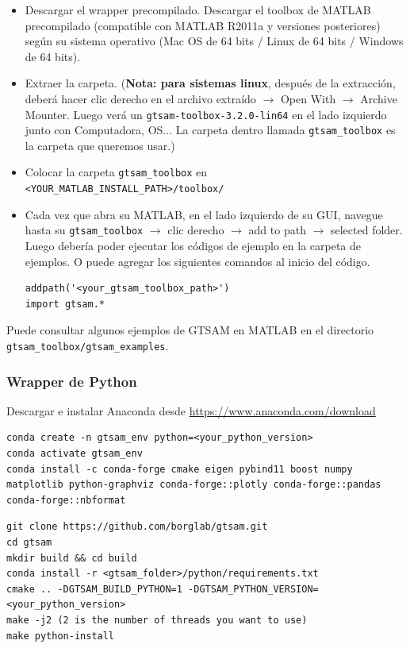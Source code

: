 \documentclass[tp]{lcc}
\begin{document}
\begin{itemize}
    \item Descargar el wrapper precompilado. Descargar el toolbox de MATLAB precompilado (compatible con MATLAB R2011a y versiones posteriores) según su sistema operativo (Mac OS de 64 bits / Linux de 64 bits / Windows de 64 bits).
    \item Extraer la carpeta. (\textbf{Nota: para sistemas linux}, después de la extracción, deberá hacer clic derecho en el archivo extraído $\rightarrow$ Open With $\rightarrow$ Archive Mounter. Luego verá un \lstinline[style=bash]{gtsam-toolbox-3.2.0-lin64} en el lado izquierdo junto con Computadora, OS... La carpeta dentro llamada \lstinline[style=bash]{gtsam_toolbox} es la carpeta que queremos usar.)
    \item Colocar la carpeta \lstinline[style=bash]{gtsam_toolbox} en \lstinline[style=bash]{<YOUR_MATLAB_INSTALL_PATH>/toolbox/}
    \item Cada vez que abra su MATLAB, en el lado izquierdo de su GUI, navegue hasta su \lstinline[style=bash]{gtsam_toolbox} $\rightarrow$ clic derecho $\rightarrow$ add to path $\rightarrow$ selected folder. Luego debería poder ejecutar los códigos de ejemplo en la carpeta de ejemplos. O puede agregar los siguientes comandos al inicio del código.
    \begin{lstlisting}[style=bash]
addpath('<your_gtsam_toolbox_path>')
import gtsam.*
    \end{lstlisting}
\end{itemize}

Puede consultar algunos ejemplos de GTSAM en MATLAB en el directorio \lstinline[style=bash]{gtsam_toolbox/gtsam_examples}.

\subsubsection*{Wrapper de Python}

Descargar e instalar Anaconda desde \url{https://www.anaconda.com/download}

\begin{lstlisting}[style=bash] 
conda create -n gtsam_env python=<your_python_version>
conda activate gtsam_env
conda install -c conda-forge cmake eigen pybind11 boost numpy matplotlib python-graphviz conda-forge::plotly conda-forge::pandas conda-forge::nbformat
\end{lstlisting}

\begin{lstlisting}[style=bash] 
git clone https://github.com/borglab/gtsam.git
cd gtsam
mkdir build && cd build
conda install -r <gtsam_folder>/python/requirements.txt
cmake .. -DGTSAM_BUILD_PYTHON=1 -DGTSAM_PYTHON_VERSION=<your_python_version>
make -j2 (2 is the number of threads you want to use)
make python-install
\end{lstlisting}
\end{document}
